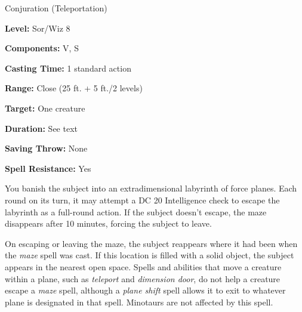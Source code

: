 
Conjuration (Teleportation)

\textbf{Level:} Sor/Wiz 8

\textbf{Components:} V, S

\textbf{Casting Time:} 1 standard action

\textbf{Range:} Close (25 ft. + 5 ft./2 levels)

\textbf{Target:} One creature

\textbf{Duration:} See text

\textbf{Saving Throw:} None

\textbf{Spell Resistance:} Yes

You banish the subject into an extradimensional labyrinth of force planes. Each 
round on its turn, it may attempt a DC 20 Intelligence check to escape the labyrinth 
as a full-round action. If the subject doesn't escape, the maze disappears after 
10 minutes, forcing the subject to leave.

On escaping or leaving the maze, the subject reappears where it had been when the 
\textit{maze} spell was cast. If this location is filled with a solid object, the 
subject appears in the nearest open space. Spells and abilities that move a creature 
within a plane, such as \textit{teleport} and \textit{dimension door}, do not help 
a creature escape a \textit{maze} spell, although a \textit{plane shift} spell 
allows it to exit to whatever plane is designated in that spell. Minotaurs are 
not affected by this spell.

